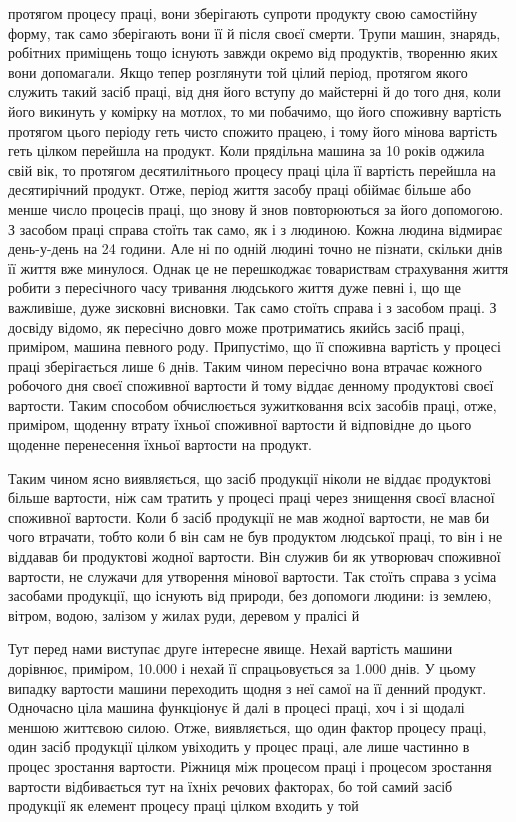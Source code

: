 \parcont{}  %
протягом процесу праці, вони зберігають супроти продукту свою
самостійну форму, так само зберігають вони її й після своєї смерти.
Трупи машин, знарядь, робітних приміщень тощо існують завжди
окремо від продуктів, творенню яких вони допомагали. Якщо
тепер розглянути той цілий період, протягом якого служить такий
засіб праці, від дня його вступу до майстерні й до того дня, коли
його викинуть у комірку на мотлох, то ми побачимо, що його
споживну вартість протягом цього періоду геть чисто спожито
працею, і тому його мінова вартість геть цілком перейшла на
продукт. Коли прядільна машина за 10 років оджила свій вік,
то протягом десятилітнього процесу праці ціла її вартість перейшла
на десятирічний продукт. Отже, період життя засобу праці
обіймає більше або менше число процесів праці, що знову й знов
повторюються за його допомогою. З засобом праці справа стоїть
так само, як і з людиною. Кожна людина відмирає день-у-день
на 24 години. Але ні по одній людині точно не пізнати, скільки
днів її життя вже минулося. Однак це не перешкоджає товариствам
страхування життя робити з пересічного часу тривання людського
життя дуже певні і, що ще важливіше, дуже зисковні висновки.
Так само стоїть справа і з засобом праці. З досвіду відомо, як
пересічно довго може протриматись якийсь засіб праці, приміром,
машина певного роду. Припустімо, що її споживна вартість у
процесі праці зберігається лише 6 днів. Таким чином пересічно
вона втрачає кожного робочого дня  своєї споживної вартости
й тому віддає денному продуктові  своєї вартости. Таким способом
обчислюється зужитковання всіх засобів праці, отже,
приміром, щоденну втрату їхньої споживної вартости й відповідне
до цього щоденне перенесення їхньої вартости на продукт.

Таким чином ясно виявляється, що засіб продукції ніколи не
віддає продуктові більше вартости, ніж сам тратить у процесі
праці через знищення своєї власної споживної вартости. Коли б
засіб продукції не мав жодної вартости, не мав би чого втрачати,
тобто коли б він сам не був продуктом людської праці, то він і
не віддавав би продуктові жодної вартости. Він служив би як
утворювач споживної вартости, не служачи для утворення мінової
вартости. Так стоїть справа з усіма засобами продукції, що
існують від природи, без допомоги людини: із землею, вітром,
водою, залізом у жилах руди, деревом у пралісі й~

Тут перед нами виступає друге інтересне явище. Нехай вартість
машини дорівнює, приміром, \num{10.000}
і нехай її спрацьовується за \num{1.000} днів. У цьому випадку  вартости
машини переходить щодня з неї самої на її денний продукт.
Одночасно ціла машина функціонує й далі в процесі праці, хоч
і зі щодалі меншою життєвою силою. Отже, виявляється, що
один фактор процесу праці, один засіб продукції цілком увіходить
у процес праці, але лише частинно в процес зростання вартости.
Ріжниця між процесом праці і процесом зростання вартости
відбивається тут на їхніх речових факторах, бо той самий
засіб продукції як елемент процесу праці цілком входить у той
\parbreak{}  %
